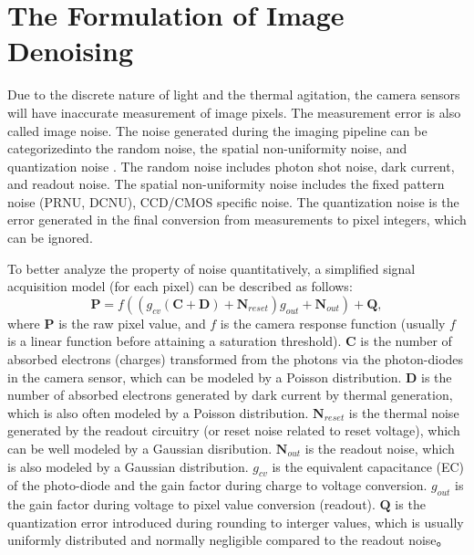 \section{The Formulation of Image Denoising}
\label{sec:intro:current}

Due to the discrete nature of light and the thermal agitation, the camera sensors will have inaccurate measurement of image pixels. The measurement error is also called image noise. The noise generated during the imaging pipeline can be categorizedinto the random noise, the spatial non-uniformity noise, and quantization noise \cite{healey1994radiometric,Foipractical}. The random noise includes photon shot noise, dark current, and readout noise. The spatial non-uniformity noise includes the fixed pattern noise (PRNU, DCNU), CCD/CMOS specific noise. The quantization noise is the error generated in the final conversion from measurements to pixel integers, which can be ignored.

To better analyze the property of noise quantitatively, a simplified signal acquisition model \cite{Foipractical} (for each pixel) can be described as follows:
\begin{equation}
\label{e11}
\bm{P} = f((g_{cv}(\bm{C}+\bm{D})+\bm{N}_{reset})g_{out}+\bm{N}_{out})+\bm{Q},
\end{equation}
where $\bm{P}$ is the raw pixel value, and $f$ is the camera response function (usually $f$ is a linear function before attaining a saturation threshold). $\bm{C}$ is the number of absorbed electrons (charges) transformed from the photons via the photon-diodes in the camera sensor, which can be modeled by a Poisson distribution. $\bm{D}$ is the number of absorbed electrons generated by dark current by thermal generation, which is also often modeled by a Poisson distribution. $\bm{N}_{reset}$ is the thermal noise generated by the readout circuitry (or reset noise related to reset voltage), which can be well modeled by a Gaussian disribution. $\bm{N}_{out}$ is the readout noise, which is also modeled by a Gaussian distribution. $g_{cv}$ is the equivalent capacitance (EC) of the photo-diode and the gain factor during charge to voltage conversion. $g_{out}$ is the gain factor during voltage to pixel value conversion (readout). $\bm{Q}$ is the quantization error introduced during rounding to interger values, which is usually uniformly distributed and normally negligible compared to the readout noise。

